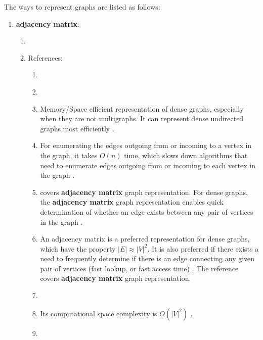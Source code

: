 The ways to represent graphs are listed as follows: \vspace{-0.3cm}
\begin{enumerate} \itemsep -4pt
\item {\bf adjacency matrix}: \vspace{-0.3cm}
	\begin{enumerate} \itemsep -2pt
	\item 
	\item References: \vspace{-0.2cm}
		\begin{enumerate} \itemsep -2pt
		\item \cite{WikipediaContributors2018a49,Savage1998}
		\item \cite[\S52.7, pp. 844; \S52.6--\S52.7, pp. 851--856]{Goldman2008}
		\item Memory/Space efficient representation of dense graphs, especially when they are not multigraphs. It can represent dense undirected graphs most efficiently \cite[\S54, pp. 883]{Goldman2008}.
		\item For enumerating the edges outgoing from or incoming to a vertex in the graph, it takes $O(n)$ time, which slows down algorithms that need to enumerate edges outgoing from or incoming to each vertex in the graph \cite[\S54, pp. 883]{Goldman2008}.
		\item \cite[\S22.1, pp. 589, 591--592]{Cormen2009} covers {\bf adjacency matrix} graph representation. For dense graphs, the {\bf adjacency matrix} graph representation enables quick determination of whether an edge exists between any pair of vertices in the graph \cite[\S22.1, pp. 589]{Cormen2009}.
		\item An adjacency matrix is a preferred representation for dense graphs, which have the property $|E| \approx |V|^{2}$. It is also preferred if there exists a need to frequently determine if there is an edge connecting any given pair of vertices (fast lookup, or fast access time) \cite[\S22.1, pp. 589]{Cormen2009}. The reference \cite[\S22.1, pp. 589--590]{Cormen2009} covers {\bf adjacency matrix} graph representation.
		\item \cite[\S5, pp. 78]{Cormen2013}
		\item Its computational space complexity is $O(|V|^{2})$ \cite[\S13.2, pp. 600]{Goodrich2011} \cite[\S14.2, pp. 627]{Goodrich2013} \cite{WikipediaContributors2018a49}.
		\item \cite[\S13.2.3, pp. 605--606]{Goodrich2011}
		\cite[\S14.2, pp. 627; \S14.2.4, pp. 633]{Goodrich2013}

\end{enumerate}
\end{enumerate}
\end{enumerate}
